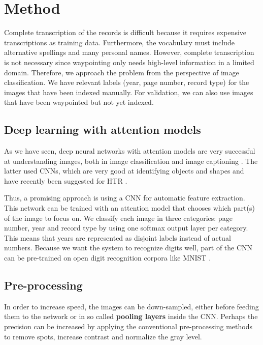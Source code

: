 \section{Method}

Complete transcription of the records is difficult because it requires expensive transcriptions as training data. Furthermore, the vocabulary must include alternative spellings and many personal names.
However, complete transcription is not necessary since waypointing only needs high-level information in a limited domain.
Therefore, we approach the problem from the perspective of image classification. We have relevant labels (year, page number, record type) for the images that have been indexed manually. For validation, we can also use images that have been waypointed but not yet indexed.

\subsection{Deep learning with attention models}

As we have seen, deep neural networks with attention models are very successful at understanding images, both in image classification \cite{DeepMindAttention} and image captioning \cite{AttendAndTell}. The latter used CNNs, which are very good at identifying objects and shapes and have recently been suggested for HTR \cite{offline_HWR_CNN}.

Thus, a promising approach is using a CNN for automatic feature extraction. This network can be trained with an attention model that chooses which part(s) of the image to focus on.
We classify each image in three categories: page number, year and record type by using one softmax output layer per category. This means that years are represented as disjoint labels instead of actual numbers.
Because we want the system to recognize digits well,
part of the CNN can be pre-trained on open digit recognition corpora like MNIST \cite{MNIST}.


\subsection{Pre-processing}

In order to increase speed, the images can be down-sampled, either before feeding them to the network or in so called \textbf{pooling layers} inside the CNN. Perhaps the precision can be increased by applying the conventional pre-processing methods to remove spots, increase contrast and normalize the gray level.

